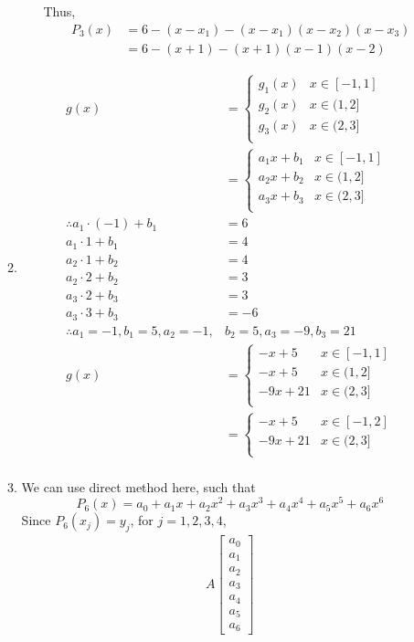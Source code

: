 \documentclass{article}
\begin{document}
\begin{enumerate}
\begin{enumerate}
\begin{enumerate}
Thus,\begin{align*}
P_3(x) &= 6-(x-x_1)- (x-x_1)(x-x_2)(x-x_3) \\
&= 6-(x+1)- (x+1)(x-1)(x-2) 
\end{align*}
\end{enumerate}
\item
\begin{align*}
g(x)&=\begin{cases}g_1(x)&x\in[-1,1]\\g_2(x)&x\in(1,2]\\g_3(x)&x\in(2,3]\\\end{cases}\\
&=\begin{cases}a_1x+b_1&x\in[-1,1]\\a_2x+b_2&x\in(1,2]\\a_3x+b_3&x\in(2,3]\\\end{cases}\\
\therefore a_1\cdot (-1)+b_1 &=6\\
a_1\cdot 1+b_1 &=4\\
a_2\cdot 1+b_2 &=4\\
a_2\cdot 2+b_2 &=3\\
a_3\cdot 2+b_3 &=3\\
a_3\cdot 3+b_3 &=-6\\
\therefore a_1=-1,b_1 =5,a_2=-1,&b_2=5,a_3=-9,b_3=21\\
g(x)&=\begin{cases}-x+5&x\in[-1,1]\\-x+5&x\in(1,2]\\-9x+21&x\in(2,3]\\\end{cases}\\
&=\begin{cases}-x+5&x\in[-1,2]\\-9x+21&x\in(2,3]\\\end{cases}\\
\end{align*}
\item
We can use direct method here, such that 
\[P_6(x) = a_0+a_1x+a_2x^2+a_3x^3+a_4x^4+a_5x^5+a_6x^6\]
Since $P_6(x_j) = y_j$, for $j = 1,2,3,4$, \begin{align*}
A\begin{bmatrix}
a_0\\a_1\\a_2\\a_3\\a_4\\a_5\\a_6

\end{bmatrix}
\end{align*}
\end{enumerate}
\end{enumerate}
\end{document}
